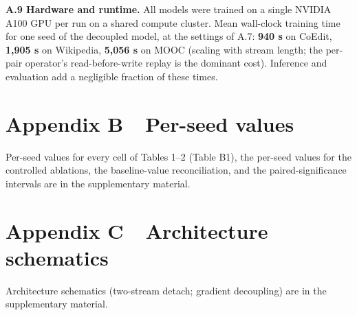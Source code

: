 \documentclass[conference]{IEEEtran}
\begin{document}
\textbf{A.9 Hardware and runtime.} All models were trained on a single NVIDIA A100 GPU per run on a shared compute cluster. Mean wall-clock training time for one seed of the decoupled model, at the settings of A.7: \textbf{940 s} on CoEdit, \textbf{1,905 s} on Wikipedia, \textbf{5,056 s} on MOOC (scaling with stream length; the per-pair operator's read-before-write replay is the dominant cost). Inference and evaluation add a negligible fraction of these times.

\section*{Appendix B~~Per-seed values}

Per-seed values for every cell of Tables 1--2 (Table B1), the per-seed values for the controlled ablations, the baseline-value reconciliation, and the paired-significance intervals are in the supplementary material.

\section*{Appendix C~~Architecture schematics}

Architecture schematics (two-stream detach; gradient decoupling) are in the supplementary material.
\end{document}

